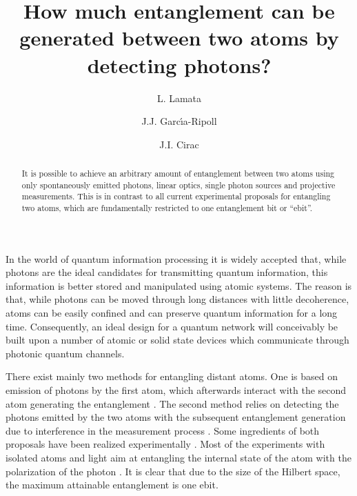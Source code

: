 \documentclass[aps,prl,onecolumn,superscriptaddress,showpacs,nofootonbib]{revtex4-2}
\begin{document}
\title{How much entanglement can be generated between two atoms by detecting photons?}


\author{L. Lamata}
 


\author{J.J. Garc\'{\i}a-Ripoll}

\author{J.I. Cirac}



\begin{abstract}
  It is possible to achieve an arbitrary amount of entanglement
  between two atoms using only spontaneously emitted photons, linear
  optics, single photon sources and projective measurements. This is
  in contrast to all current experimental proposals for entangling two
  atoms, which are fundamentally restricted to one entanglement bit
  or ``ebit''.
\end{abstract}


\maketitle

In the world of quantum information processing it is widely accepted
that, while photons are the ideal candidates for transmitting quantum
information, this information is better stored and manipulated using
atomic systems. The reason is that, while photons can be moved through
long distances with little decoherence, atoms can be easily confined
and can preserve quantum information for a long time.  Consequently,
an ideal design for a quantum network will conceivably be built upon a
number of atomic or solid state devices which communicate through
photonic quantum channels.

There exist mainly two methods for entangling distant atoms. One is
based on emission of photons by the first atom, which afterwards
interact with the second atom generating the entanglement
\cite{CirZolKimMab97,EnkCirZol97,GheSaaTorCirZol98,ParKim00,ChaLawEbe02,ChaLawEbe03}.
The second method relies on detecting the photons emitted by the two
atoms with the subsequent entanglement generation due to
interference in the measurement process
\cite{Cabrillo99,BosKniPleVed99}. Some ingredients of both proposals
have been realized experimentally
\cite{Polzik01,Rempe02,Kimble04,Blinov04,Volz05,Kuzmich06,Grangier06,Maunz06,Kimble05,Darquie06}.
Most of the experiments with isolated atoms and light aim at
entangling the internal state of the atom with the polarization of
the photon
\cite{Rempe02,Kimble04,Blinov04,Volz05,Kuzmich06,Grangier06,Maunz06,Darquie06}.
It is clear that due to the size of the Hilbert space, the maximum
attainable entanglement is one ebit.
\end{document}
